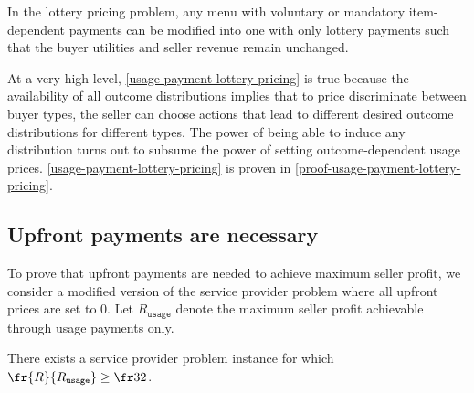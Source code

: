 \begin{proposition} \label{usage-payment-lottery-pricing}
      In the lottery pricing problem, any menu with voluntary or mandatory item-dependent payments can be modified into one with only lottery payments such that the buyer utilities and seller revenue remain unchanged.
 \end{proposition}
 
 At a very high-level, \cref{usage-payment-lottery-pricing} is true because the availability of all outcome distributions implies that to price discriminate between buyer types, the seller can choose actions that lead to different desired outcome distributions for different types. The power of being able to induce any distribution turns out to subsume the power of setting outcome-dependent usage prices. \cref{usage-payment-lottery-pricing} is proven in \cref{proof-usage-payment-lottery-pricing}.



\subsection{Upfront payments are necessary} \label{upfront-payment-necessary}

\newcommand{\Rusage}{R_\mathtt{usage}}

To prove that upfront payments are needed to achieve maximum seller profit, we consider a modified version of the service provider problem where all upfront prices are set to 0. Let $\Rusage$ denote the maximum seller profit achievable through usage payments only.

\begin{proposition} \label{usage-payment-only}
    There exists a service provider problem instance for which $\fr{R}{\Rusage} \ge \fr32$.
\end{proposition}



